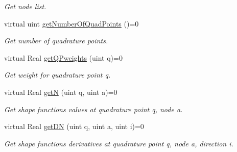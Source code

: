 \begin{DoxyCompactItemize}
\begin{DoxyCompactList}\small\item\em Get node list. \item\end{DoxyCompactList}\item 
\hypertarget{classvoom_1_1_geom_element_aba65f5dd190d08d23f396714eba8b087}{
virtual uint \hyperlink{classvoom_1_1_geom_element_aba65f5dd190d08d23f396714eba8b087}{getNumberOfQuadPoints} ()=0}
\label{classvoom_1_1_geom_element_aba65f5dd190d08d23f396714eba8b087}

\begin{DoxyCompactList}\small\item\em Get number of quadrature points. \item\end{DoxyCompactList}\item 
\hypertarget{classvoom_1_1_geom_element_a45955cbf2475348fbdf272923eafb6ee}{
virtual Real \hyperlink{classvoom_1_1_geom_element_a45955cbf2475348fbdf272923eafb6ee}{getQPweights} (uint q)=0}
\label{classvoom_1_1_geom_element_a45955cbf2475348fbdf272923eafb6ee}

\begin{DoxyCompactList}\small\item\em Get weight for quadrature point q. \item\end{DoxyCompactList}\item 
\hypertarget{classvoom_1_1_geom_element_a5c121346fffab018f6a9a52ac7d492e9}{
virtual Real \hyperlink{classvoom_1_1_geom_element_a5c121346fffab018f6a9a52ac7d492e9}{getN} (uint q, uint a)=0}
\label{classvoom_1_1_geom_element_a5c121346fffab018f6a9a52ac7d492e9}

\begin{DoxyCompactList}\small\item\em Get shape functions values at quadrature point q, node a. \item\end{DoxyCompactList}\item 
\hypertarget{classvoom_1_1_geom_element_a992248c1ab6844b977eed4f28bc17a63}{
virtual Real \hyperlink{classvoom_1_1_geom_element_a992248c1ab6844b977eed4f28bc17a63}{getDN} (uint q, uint a, uint i)=0}
\label{classvoom_1_1_geom_element_a992248c1ab6844b977eed4f28bc17a63}

\begin{DoxyCompactList}\small\item\em Get shape functions derivatives at quadrature point q, node a, direction i. \item\end{DoxyCompactList}\end{DoxyCompactItemize}
